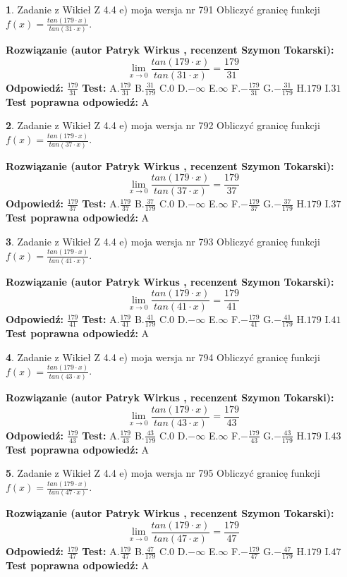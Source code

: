\documentclass[12pt, a4paper]{article}
\theoremstyle{definition} %
\newtheorem{zad}{}
\newcommand{\zadStart}[1]{\begin{zad}#1\newline}
\newcommand{\zadStop}{\end{zad}}
\newcommand{\rozwStart}[2]{\noindent \textbf{Rozwiązanie (autor #1 , recenzent #2): }\newline}
\newcommand{\rozwStop}{\newline}
\newcommand{\odpStart}{\noindent \textbf{Odpowiedź:}\newline}
\newcommand{\odpStop}{\newline}
\newcommand{\testStart}{\noindent \textbf{Test:}\newline}
\newcommand{\testStop}{\newline}
\newcommand{\kluczStart}{\noindent \textbf{Test poprawna odpowiedź:}\newline}
\newcommand{\kluczStop}{\newline}
\begin{document}
\zadStart{Zadanie z Wikieł Z 4.4 e) moja wersja nr 791}
Obliczyć granicę funkcji $f(x)=\frac{tan(179\cdot x)}{tan(31\cdot x)}$.
\zadStop
\rozwStart{Patryk Wirkus}{Szymon Tokarski}
$$\lim\limits_{x\to 0}\frac{tan(179\cdot x)}{tan(31\cdot x)}=
\frac{179}{31}$$
\rozwStop
\odpStart
$\frac{179}{31}$
\odpStop
\testStart
A.$\frac{179}{31}$
B.$\frac{31}{179}$
C.$0$
D.$-\infty$
E.$\infty$
F.$-\frac{179}{31}$
G.$-\frac{31}{179}$
H.$179$
I.$31$
\testStop
\kluczStart
A
\kluczStop



\zadStart{Zadanie z Wikieł Z 4.4 e) moja wersja nr 792}
Obliczyć granicę funkcji $f(x)=\frac{tan(179\cdot x)}{tan(37\cdot x)}$.
\zadStop
\rozwStart{Patryk Wirkus}{Szymon Tokarski}
$$\lim\limits_{x\to 0}\frac{tan(179\cdot x)}{tan(37\cdot x)}=
\frac{179}{37}$$
\rozwStop
\odpStart
$\frac{179}{37}$
\odpStop
\testStart
A.$\frac{179}{37}$
B.$\frac{37}{179}$
C.$0$
D.$-\infty$
E.$\infty$
F.$-\frac{179}{37}$
G.$-\frac{37}{179}$
H.$179$
I.$37$
\testStop
\kluczStart
A
\kluczStop



\zadStart{Zadanie z Wikieł Z 4.4 e) moja wersja nr 793}
Obliczyć granicę funkcji $f(x)=\frac{tan(179\cdot x)}{tan(41\cdot x)}$.
\zadStop
\rozwStart{Patryk Wirkus}{Szymon Tokarski}
$$\lim\limits_{x\to 0}\frac{tan(179\cdot x)}{tan(41\cdot x)}=
\frac{179}{41}$$
\rozwStop
\odpStart
$\frac{179}{41}$
\odpStop
\testStart
A.$\frac{179}{41}$
B.$\frac{41}{179}$
C.$0$
D.$-\infty$
E.$\infty$
F.$-\frac{179}{41}$
G.$-\frac{41}{179}$
H.$179$
I.$41$
\testStop
\kluczStart
A
\kluczStop



\zadStart{Zadanie z Wikieł Z 4.4 e) moja wersja nr 794}
Obliczyć granicę funkcji $f(x)=\frac{tan(179\cdot x)}{tan(43\cdot x)}$.
\zadStop
\rozwStart{Patryk Wirkus}{Szymon Tokarski}
$$\lim\limits_{x\to 0}\frac{tan(179\cdot x)}{tan(43\cdot x)}=
\frac{179}{43}$$
\rozwStop
\odpStart
$\frac{179}{43}$
\odpStop
\testStart
A.$\frac{179}{43}$
B.$\frac{43}{179}$
C.$0$
D.$-\infty$
E.$\infty$
F.$-\frac{179}{43}$
G.$-\frac{43}{179}$
H.$179$
I.$43$
\testStop
\kluczStart
A
\kluczStop



\zadStart{Zadanie z Wikieł Z 4.4 e) moja wersja nr 795}
Obliczyć granicę funkcji $f(x)=\frac{tan(179\cdot x)}{tan(47\cdot x)}$.
\zadStop
\rozwStart{Patryk Wirkus}{Szymon Tokarski}
$$\lim\limits_{x\to 0}\frac{tan(179\cdot x)}{tan(47\cdot x)}=
\frac{179}{47}$$
\rozwStop
\odpStart
$\frac{179}{47}$
\odpStop
\testStart
A.$\frac{179}{47}$
B.$\frac{47}{179}$
C.$0$
D.$-\infty$
E.$\infty$
F.$-\frac{179}{47}$
G.$-\frac{47}{179}$
H.$179$
I.$47$
\testStop
\kluczStart
A
\kluczStop
\end{document}
